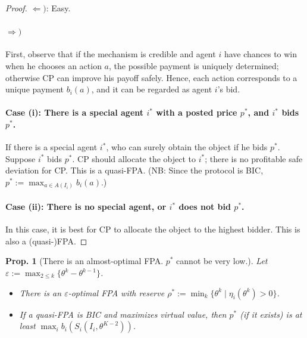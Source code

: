 \documentclass[11pt,a4paper,dvipdfmx]{article}
\theoremstyle{plain}
\newtheorem{prop}{Prop.}[section]
\renewcommand{\epsilon}{\varepsilon}
\newcommand{\1}{\mathbbm{1}}
\begin{document}
\begin{proof}
	$\Leftarrow)$: Easy.
	\paragraph{$\Rightarrow)$}
	First, observe that if the mechanism is credible and agent $i$ have chances to win when he chooses an action $a$, the possible payment is uniquely determined; otherwise CP can improve his payoff safely. Hence, each action corresponds to a unique payment $b_i(a)$, and it can be regarded as agent $i$'s bid.
	\paragraph{Case (i): There is a special agent $i^*$ with a posted price $p^*$, and $i^*$ bids $p^*$.}
	If there is a special agent $i^*$, who can surely obtain the object if he bids $p^*$. Suppose $i^*$ bids $p^*$. CP should allocate the object to $i^*$; there is no profitable safe deviation for CP. This is a quasi-FPA.
	(NB: Since the protocol is BIC, $p^* := \max_{a \in A(I_i)} b_i(a)$.)
		
	\paragraph{Case (ii): There is no special agent, or $i^*$ does not bid $p^*$.}
	In this case, it is best for CP to allocate the object to the highest bidder. This is also a (quasi-)FPA.
\end{proof}

\begin{screen}
\begin{prop}[There is an almost-optimal FPA. $p^*$ cannot be very low.] \label{prop_q-fpa}
	Let $\epsilon := \max_{2 \leq k} \{\theta^{k} - \theta^{k-1}\}$.
	\begin{itemize}
		\item There is an $\epsilon$-optimal FPA with reserve $\rho^* := \min_k \{\theta^k \mid \eta_i(\theta^k) > 0\}$.
		\item If a quasi-FPA is BIC and maximizes virtual value, then $p^*$ (if it exists) is at least $\max_i b_i(S_i(I_i, \theta^{K-2}))$.
	\end{itemize}
\end{prop}	
\end{screen}
\end{document}
